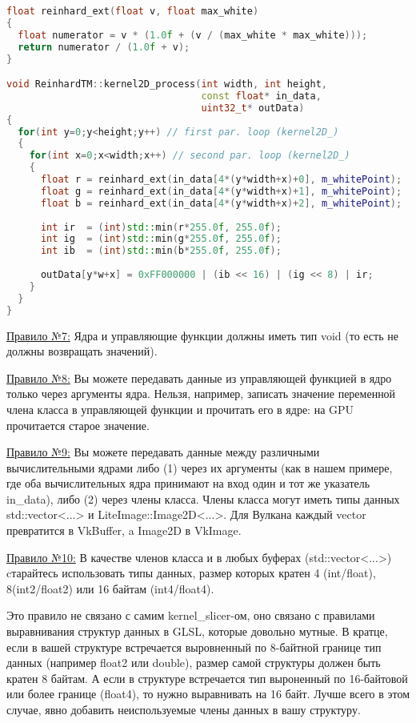 \documentclass[11pt,fleqn,english,russian]{report} %
\begin{document}
\begin{lstlisting}[language=C++, 
	               caption=двумерное вычислительное ядро вызывает функцию reinhard\_ext, 
	               label=lst:kernel2D_process]	
float reinhard_ext(float v, float max_white)
{
  float numerator = v * (1.0f + (v / (max_white * max_white)));
  return numerator / (1.0f + v);
}

void ReinhardTM::kernel2D_process(int width, int height, 
                                  const float* in_data, 
                                  uint32_t* outData)
{
  for(int y=0;y<height;y++) // first par. loop (kernel2D_)
  {
    for(int x=0;x<width;x++) // second par. loop (kernel2D_)
    {
      float r = reinhard_ext(in_data[4*(y*width+x)+0], m_whitePoint);
      float g = reinhard_ext(in_data[4*(y*width+x)+1], m_whitePoint);
      float b = reinhard_ext(in_data[4*(y*width+x)+2], m_whitePoint);
			
      int ir  = (int)std::min(r*255.0f, 255.0f);
      int ig  = (int)std::min(g*255.0f, 255.0f);
      int ib  = (int)std::min(b*255.0f, 255.0f);
			
      outData[y*w+x] = 0xFF000000 | (ib << 16) | (ig << 8) | ir;
    }
  }
}
\end{lstlisting}

\underline{Правило №7:} Ядра и управляющие функции должны иметь тип void (то есть не должны возвращать значений).

\underline{Правило №8:} Вы можете передавать данные из управляющей функцией в ядро только через аргументы ядра. Нельзя, например, записать значение переменной члена класса в управляющей функции и прочитать его в ядре: на GPU прочитается старое значение.

\underline{Правило №9:} Вы можете передавать данные между различными вычислительными ядрами либо (1) через их аргументы (как в нашем примере, где оба вычислительных ядра принимают на вход один и тот же указатель in\_data), либо (2) через члены класса. Члены класса могут иметь типы данных std::vector<...> и LiteImage::Image2D<...>. Для Вулкана каждый vector превратится в VkBuffer, a Image2D в VkImage.

\underline{Правило №10:} В качестве членов класса и в любых буферах (std::vector<...>) cтарайтесь использовать типы данных, размер которых кратен 4 (int/float), 8(int2/float2) или 16 байтам (int4/float4). 

\begin{remark}
Это правило не связано с самим kernel\_slicer-ом, оно связано с правилами выравнивания структур данных в GLSL, которые довольно мутные. В кратце, если в вашей структуре встречается выровненный по 8-байтной границе тип данных (например float2 или double), размер самой структуры должен быть кратен 8 байтам. А если в структуре встречается тип выроненный по 16-байтовой или более границе (float4), то нужно выравнивать на 16 байт. Лучше всего в этом случае, явно добавить неиспользуемые члены данных в вашу структуру.
\end{remark}
\end{document}
